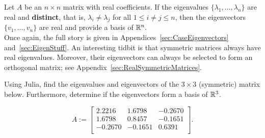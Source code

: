 \vspace*{0.5cm}
\begin{tcolorbox}[sharp corners, colback=green!30, colframe=green!80!blue, title=\textbf{\Large When the Eigenvalues are Real and Distinct, the Eigenvectors form a Basis of $\real^n$}]
Let $A$ be an $n \times n$ matrix with real coefficients. If the eigenvalues $\{ \lambda_1,\ldots, \lambda_n \}$ are real and \textbf{distinct}, that is, $\lambda_i \neq \lambda_j $ for all $1 \le i \neq j \le n$, then the eigenvectors $\{ v_1,\ldots,v_n \}$ are real and provide a basis of $\mathbb R^n.$\\

Once again, the full story is given in Appendices~\ref{sec:CaseEigenvectors} and~\ref{sec:EigenStuff}. An interesting tidbit is that symmetric matrices always have real eigenvalues. Moreover, their eigenvectors can always be selected to form an orthogonal matrix; see Appendix~\ref{sec:RealSymmetricMatrices}.
\end{tcolorbox}

\vspace*{0.5cm}

\begin{example}
\label{ex:BasisEigenvectors}
Using Julia, find the eigenvalues and eigenvectors of the $3 \times 3$ (symmetric) matrix below. Furthermore, determine if the eigenvectors form a basis of $\mathbb R^3$.

\begin{equation}
A:=\left[
\begin{array}{rrr}
2.2216 & 1.6798 & -0.2670 \\
1.6798 & 0.8457 & -0.1651 \\
-0.2670 & -0.1651 & 0.6391 \\
\end{array}
\right].
\end{equation}
\end{example}

